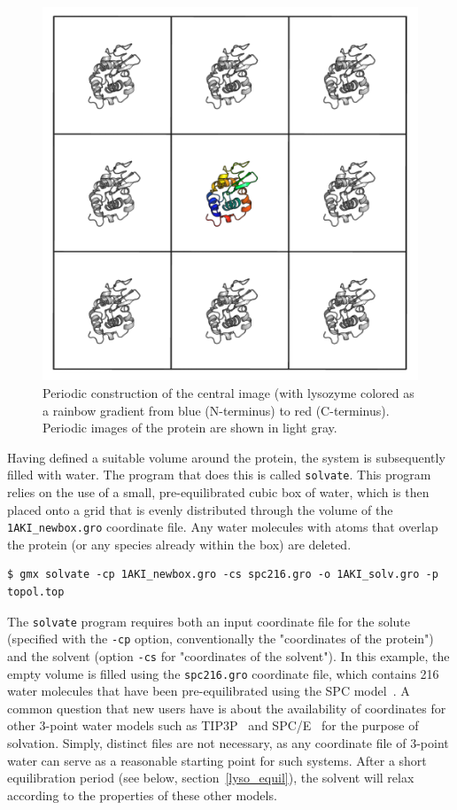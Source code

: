\documentclass[9pt,tutorial,pubversion]{livecoms}
\begin{document}
\begin{figure}[h]
\centering
\includegraphics{1AKI_boxes}
\caption{Periodic construction of the central image (with lysozyme colored as a rainbow gradient from blue (N-terminus) to red (C-terminus). Periodic images of the protein are shown in light gray.}
\label{lyso_boxes_fig}
\end{figure}

Having defined a suitable volume around the protein, the system is subsequently filled with water. The program that does this is called \texttt{solvate}. This program relies on the use of a small, pre-equilibrated cubic box of water, which is then placed onto a grid that is evenly distributed through the volume of the \texttt{1AKI\_newbox.gro} coordinate file. Any water molecules with atoms that overlap the protein (or any species already within the box) are deleted.

\begin{lstlisting}
$ gmx solvate -cp 1AKI_newbox.gro -cs spc216.gro -o 1AKI_solv.gro -p topol.top
\end{lstlisting}

The \texttt{solvate} program requires both an input coordinate file for the solute (specified with the \texttt{-cp} option, conventionally the "coordinates of the protein") and the solvent (option \texttt{-cs} for "coordinates of the solvent"). In this example, the empty volume is filled using the \texttt{spc216.gro} coordinate file, which contains 216 water molecules that have been pre-equilibrated using the SPC model~\cite{Berendsen1981}. A common question that new users have is about the availability of coordinates for other 3-point water models such as TIP3P~\cite{Jorgensen1983} and SPC/E~\cite{Berendsen1987} for the purpose of solvation. Simply, distinct files are not necessary, as any coordinate file of 3-point water can serve as a reasonable starting point for such systems. After a short equilibration period (see below, section~\ref{lyso_equil}), the solvent will relax according to the properties of these other models.
\end{document}
